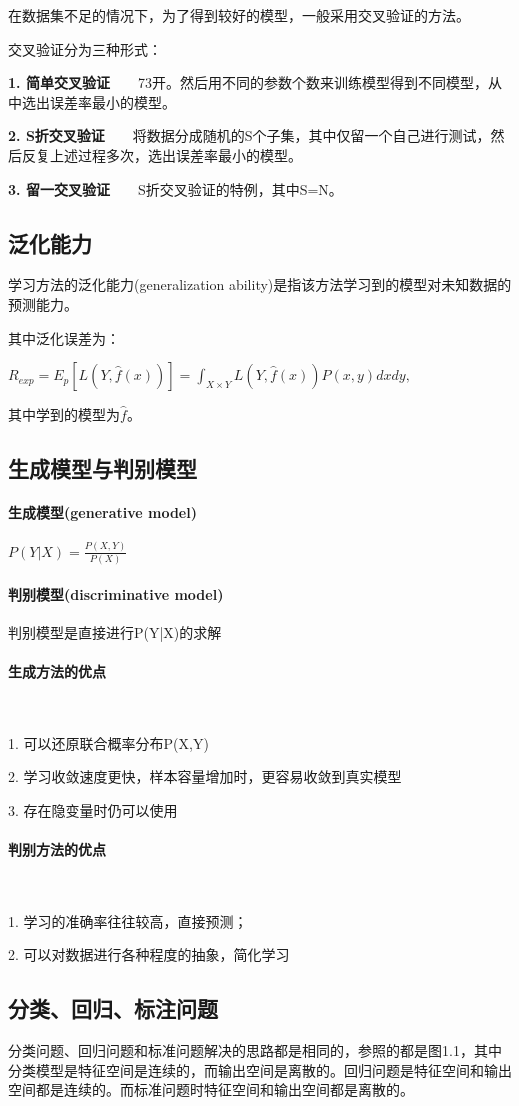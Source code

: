 \documentclass[UTF8]{ctexart}
\begin{document}
	在数据集不足的情况下，为了得到较好的模型，一般采用交叉验证的方法。

	交叉验证分为三种形式：

	\textbf{1. 简单交叉验证}\ \ \ \
	73开。然后用不同的参数个数来训练模型得到不同模型，从中选出误差率最小的模型。

	\textbf{2. S折交叉验证}\ \ \  \
	将数据分成随机的S个子集，其中仅留一个自己进行测试，然后反复上述过程多次，选出误差率最小的模型。

	\textbf{3. 留一交叉验证}\ \ \ \
	S折交叉验证的特例，其中S=N。

	\subsection{泛化能力}
	学习方法的泛化能力(generalization ability)是指该方法学习到的模型对未知数据的预测能力。

	其中泛化误差为：

	$R_{exp}=E_p[L(Y,\widehat{f}(x))]=\int_{X\times Y}L(Y,\widehat{f}(x))P(x,y)dxdy,\qquad\qquad$ 

	其中学到的模型为$\widehat{f}$。

	\subsection{生成模型与判别模型}
	\paragraph{生成模型(generative model)}
	$P(Y|X)=\frac{P(X,Y)}{P(X)}$

	\paragraph{判别模型(discriminative model)}
	判别模型是直接进行P(Y|X)的求解

	\paragraph{生成方法的优点}

	~

	1. 可以还原联合概率分布P(X,Y)

	2. 学习收敛速度更快，样本容量增加时，更容易收敛到真实模型

	3. 存在隐变量时仍可以使用

	\paragraph{判别方法的优点}

	~

	1. 学习的准确率往往较高，直接预测；

	2. 可以对数据进行各种程度的抽象，简化学习

	\subsection{分类、回归、标注问题}
	分类问题、回归问题和标准问题解决的思路都是相同的，参照的都是图1.1，其中分类模型是特征空间是连续的，而输出空间是离散的。回归问题是特征空间和输出空间都是连续的。而标准问题时特征空间和输出空间都是离散的。
\end{document}
